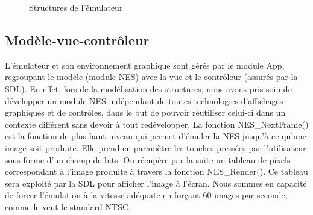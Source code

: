 \begin{figure}[H]
	\centering
  \hspace{2cm}
  \caption{Structures de l'émulateur}
  \label{fig:structure}
\end{figure}

\paragraph{}

\subsection{Modèle-vue-contrôleur}

L’émulateur et son environnement graphique sont gérés par le module App, regroupant le modèle (module NES) avec la vue et le contrôleur (assurés par la SDL). En effet, lors de la modélisation des structures, nous avons pris soin de développer un module NES indépendant de toutes technologies d'affichages graphiques et de contrôles, dans le but de pouvoir réutiliser celui-ci dans un contexte différent sans devoir à tout redévelopper. La fonction NES\_NextFrame() est la fonction de plus haut niveau qui permet d'émuler la NES jusqu’à ce qu'une image soit produite. Elle prend en paramètre les touches pressées par l'utilisateur sous forme d'un champ de bits. On récupère par la suite un tableau de pixels correspondant à l'image produite à travers la fonction NES\_Render(). Ce tableau sera exploité par la SDL pour afficher l'image à l'écran. Nous sommes en capacité de forcer l'émulation à la vitesse adéquate en forçant 60 images par seconde, comme le veut le standard NTSC.

